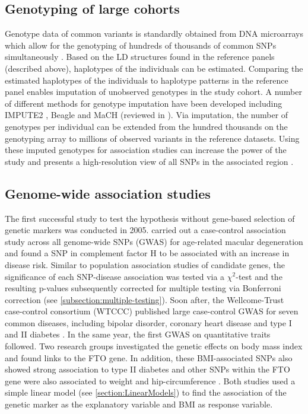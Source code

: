 \subsection{Genotyping of large cohorts}
Genotype data of common variants is standardly obtained from DNA microarrays which allow for the genotyping of hundreds of thousands of common SNPs simultaneously \citep{Wang1998}. Based on the LD structures found in the reference panels (described above), haplotypes of the individuals can be estimated. Comparing the estimated haplotypes of the individuals to haplotype patterns in the reference panel enables imputation of unobserved genotypes in the study cohort. A number of different methods for genotype imputation have been developed including IMPUTE2 \citep{Howie2009}, Beagle \citep{Browning2007} and MaCH \citep{Li2010} (reviewed in \citep{Marchini2010}). Via imputation, the number of genotypes per individual can be extended from the hundred thousands on the genotyping array to millions of observed variants in the reference datasets. Using these imputed genotypes for association studies can increase the power of the study and presents a high-resolution view of all SNPs in the associated region \citep{Marchini2010}.

\subsection{Genome-wide association studies}
\label{subsection:GWAS}
The first successful study to test the  hypothesis without gene-based selection of genetic markers was conducted in 2005. \citet{Klein2005} carried out a case-control association study across all genome-wide SNPs (GWAS) for age-related macular degeneration and found a SNP in complement factor H to be associated with an increase in disease risk. Similar to population association studies of candidate genes, the significance of each SNP-disease association was tested via a \(\chi ^2\)-test and the resulting p-values subsequently corrected for multiple testing via Bonferroni correction (see \cref{subsection:multiple-testing}). Soon after, the Wellcome-Trust case-control consortium (WTCCC) published large case-control GWAS for seven common diseases, including bipolar disorder, coronary heart disease and type I and II diabetes \citep{Burton2007}. In the same year, the first GWAS on quantitative traits followed. Two research groups investigated the genetic effects on body mass index and found links to the FTO gene. In addition, these BMI-associated SNPs also showed strong association to type II diabetes \citep{Frayling2007} and other SNPs within the FTO gene were also associated to weight and hip-circumference \citep{Scuteri2007}. Both studies used a simple linear model  (see \cref{section:LinearModels}) to find the association of the genetic marker as the explanatory variable and BMI as response variable. 

